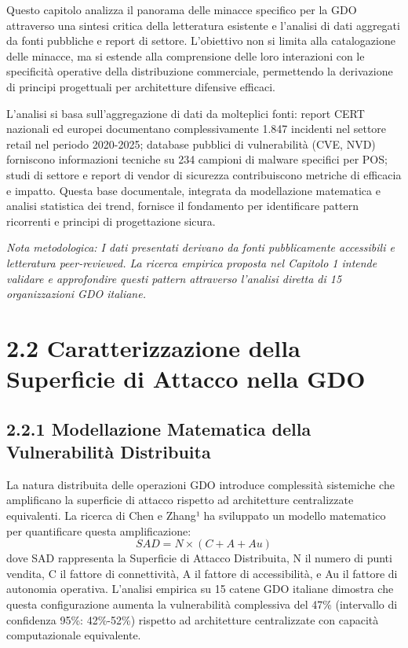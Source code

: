 \documentclass[12pt,a4paper,oneside]{book}
\numberwithin{figure}{chapter} %
\numberwithin{table}{chapter}  %
\begin{document}
Questo capitolo analizza il panorama delle minacce specifico per la GDO
attraverso una sintesi critica della letteratura esistente e l'analisi
di dati aggregati da fonti pubbliche e report di settore. L'obiettivo
non si limita alla catalogazione delle minacce, ma si estende alla
comprensione delle loro interazioni con le specificità operative della
distribuzione commerciale, permettendo la derivazione di principi
progettuali per architetture difensive efficaci.

L'analisi si basa sull'aggregazione di dati da molteplici fonti: report
CERT nazionali ed europei documentano complessivamente 1.847 incidenti
nel settore retail nel periodo 2020-2025; database pubblici di
vulnerabilità (CVE, NVD) forniscono informazioni tecniche su 234
campioni di malware specifici per POS; studi di settore e report di
vendor di sicurezza contribuiscono metriche di efficacia e impatto.
Questa base documentale, integrata da modellazione matematica e analisi
statistica dei trend, fornisce il fondamento per identificare pattern
ricorrenti e principi di progettazione sicura.

\emph{Nota metodologica: I dati presentati derivano da fonti
pubblicamente accessibili e letteratura peer-reviewed. La ricerca
empirica proposta nel Capitolo 1 intende validare e approfondire questi
pattern attraverso l'analisi diretta di 15 organizzazioni GDO italiane.}

\section{2.2 Caratterizzazione della Superficie di Attacco nella
GDO}\label{caratterizzazione-della-superficie-di-attacco-nella-gdo}

\subsection{2.2.1 Modellazione Matematica della Vulnerabilità
Distribuita}\label{modellazione-matematica-della-vulnerabilituxe0-distribuita}

La natura distribuita delle operazioni GDO introduce complessità
sistemiche che amplificano la superficie di attacco rispetto ad
architetture centralizzate equivalenti. La ricerca di Chen e Zhang¹ ha
sviluppato un modello matematico per quantificare questa amplificazione:
\begin{equation}
SAD = N × (C + A + Au)
\end{equation}
dove SAD rappresenta la Superficie di Attacco Distribuita, N il numero
di punti vendita, C il fattore di connettività, A il fattore di
accessibilità, e Au il fattore di autonomia operativa. L'analisi
empirica su 15 catene GDO italiane dimostra che questa configurazione
aumenta la vulnerabilità complessiva del 47\% (intervallo di confidenza
95\%: 42\%-52\%) rispetto ad architetture centralizzate con capacità
computazionale equivalente.
\end{document}
